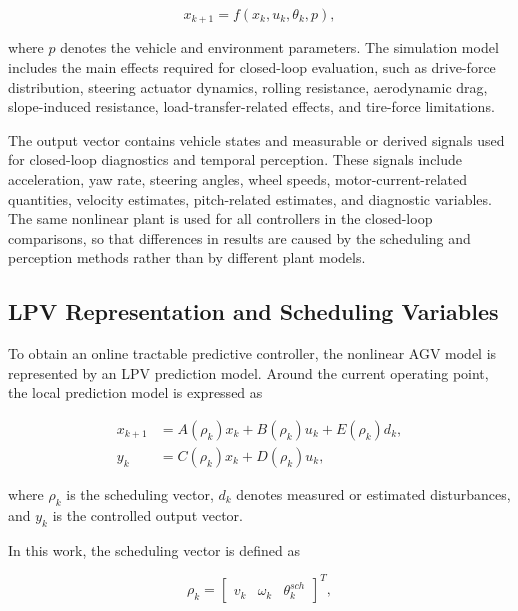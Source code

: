 \documentclass{ieeeaccess}
\begin{document}
\begin{equation}
x_{k+1}=f(x_k,u_k,\theta_k,p),
\label{eq:nonlinear_model}
\end{equation}

where $p$ denotes the vehicle and environment parameters. The simulation model includes the main effects required for closed-loop evaluation, such as drive-force distribution, steering actuator dynamics, rolling resistance, aerodynamic drag, slope-induced resistance, load-transfer-related effects, and tire-force limitations.



The output vector contains vehicle states and measurable or derived signals used for closed-loop diagnostics and temporal perception. These signals include acceleration, yaw rate, steering angles, wheel speeds, motor-current-related quantities, velocity estimates, pitch-related estimates, and diagnostic variables. The same nonlinear plant is used for all controllers in the closed-loop comparisons, so that differences in results are caused by the scheduling and perception methods rather than by different plant models.



\subsection{LPV Representation and Scheduling Variables}



To obtain an online tractable predictive controller, the nonlinear AGV model is represented by an LPV prediction model. Around the current operating point, the local prediction model is expressed as

\begin{align}
x_{k+1} &= A(\rho_k)x_k + B(\rho_k)u_k + E(\rho_k)d_k, \label{eq:lpv_state}\\
y_k &= C(\rho_k)x_k + D(\rho_k)u_k,
\label{eq:lpv_output}
\end{align}

where $\rho_k$ is the scheduling vector, $d_k$ denotes measured or estimated disturbances, and $y_k$ is the controlled output vector.



In this work, the scheduling vector is defined as

\begin{equation}
\rho_k =
\begin{bmatrix}
v_k & \omega_k & \theta^{sch}_k
\end{bmatrix}^{T},
\label{eq:scheduling_vector}
\end{equation}
\end{document}
